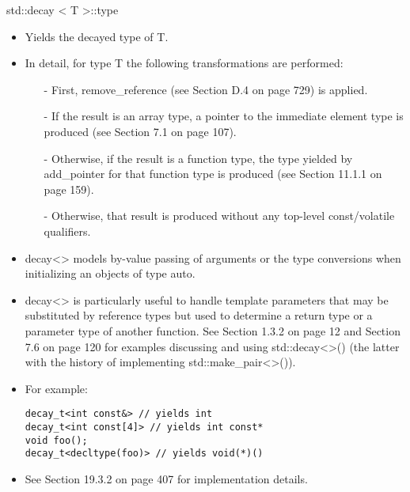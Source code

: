 std::decay < T >::type

\begin{itemize}
\item
Yields the decayed type of T.

\item
In detail, for type T the following transformations are performed:

\begin{itemize}
\item[-]
First, remove\_reference (see Section D.4 on page 729) is applied.

\item[-]
If the result is an array type, a pointer to the immediate element type is produced (see Section 7.1 on page 107).

\item[-]
Otherwise, if the result is a function type, the type yielded by add\_pointer for that function type is produced (see Section 11.1.1 on page 159).

\item[-]
Otherwise, that result is produced without any top-level const/volatile qualifiers.
\end{itemize}

\item
decay<> models by-value passing of arguments or the type conversions when initializing an objects of type auto.

\item
decay<> is particularly useful to handle template parameters that may be substituted by reference types but used to determine a return type or a parameter type of another function. See Section 1.3.2 on page 12 and Section 7.6 on page 120 for examples discussing and using std::decay<>() (the latter with the history of implementing std::make\_pair<>()).

\item
For example:
\begin{lstlisting}[style=styleCXX]
decay_t<int const&> // yields int
decay_t<int const[4]> // yields int const*
void foo();
decay_t<decltype(foo)> // yields void(*)()
\end{lstlisting}

\item
See Section 19.3.2 on page 407 for implementation details.
\end{itemize}















